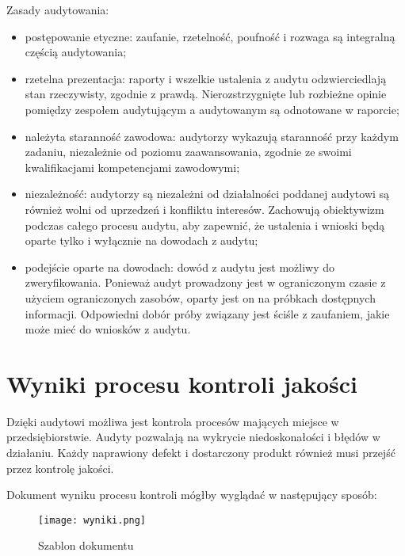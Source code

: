 Zasady audytowania:
\begin{itemize}
\item postępowanie etyczne:  zaufanie, rzetelność, poufność i rozwaga są integralną częścią audytowania;
\item rzetelna prezentacja: raporty i wszelkie ustalenia z audytu odzwierciedlają stan rzeczywisty, zgodnie z prawdą. Nierozstrzygnięte lub rozbieżne opinie pomiędzy zespołem audytującym a audytowanym są odnotowane w raporcie;
\item należyta staranność zawodowa: audytorzy wykazują staranność przy każdym zadaniu, niezależnie od poziomu zaawansowania, zgodnie ze swoimi kwalifikacjami kompetencjami zawodowymi;
\item niezależność:  audytorzy są niezależni od działalności poddanej audytowi są również wolni od uprzedzeń i konfliktu interesów. Zachowują obiektywizm podczas całego procesu audytu, aby zapewnić, że ustalenia i wnioski będą oparte tylko i wyłącznie na dowodach z audytu;
\item podejście oparte na dowodach:  dowód z audytu jest możliwy do zweryfikowania. Ponieważ audyt prowadzony jest w ograniczonym czasie z użyciem ograniczonych zasobów, oparty jest on na próbkach dostępnych informacji. Odpowiedni dobór próby związany jest ściśle z zaufaniem, jakie może mieć do wniosków z audytu.
\end{itemize}




\section{Wyniki procesu kontroli jakości}
Dzięki audytowi możliwa jest kontrola procesów mających miejsce w przedsiębiorstwie. Audyty pozwalają na wykrycie niedoskonałości i błędów w działaniu. Każdy naprawiony defekt i dostarczony produkt również musi przejść przez kontrolę jakości. 

Dokument wyniku procesu kontroli mógłby wyglądać w następujący sposób:

\begin{figure}[h]
\begin{center}
\texttt{[image: wyniki.png]}
\caption[Szablon dokumentu]{Szablon dokumentu}
\label{rysunekProces}
\end{center}
\end{figure}

